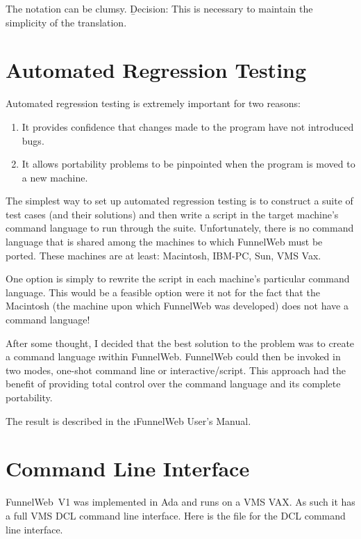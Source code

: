  The  notation can be clumsy.
\b{Decision:} This is necessary to maintain the simplicity of the translation.

\section{Automated Regression Testing}

Automated regression testing is extremely important for two reasons:

\begin{enumerate}

\item It provides confidence that changes made to the program have
not introduced bugs.

\item It allows portability problems to be pinpointed when the program is
moved to a new machine.

\end{enumerate}

The simplest way to set up automated regression testing is to construct
a suite of test cases (and their solutions) and then write a
script in the target machine's command language to run through the suite.
Unfortunately, there is no command language that is shared among the
machines to which FunnelWeb must be ported. These machines are at least:
Macintosh, IBM-PC, Sun, VMS Vax.

One option is simply to rewrite the script in each machine's particular
command language. This would be a feasible option were it not for the fact
that the Macintosh (the machine upon which FunnelWeb was developed) does
not have a command language!

After some thought, I decided that the best solution to the problem was
to create a command language \i{within FunnelWeb}. FunnelWeb could then
be invoked in two modes, one-shot command line or interactive/script. This
approach had the benefit of providing total control over the command
language and its complete portability.

The result is described in the \i{FunnelWeb User's Manual}.

\section{Command Line Interface}

FunnelWeb~V1 was implemented in Ada and runs on a VMS VAX.
As such it
has a full VMS DCL command line interface. Here is the 
file for the
DCL command line interface.

